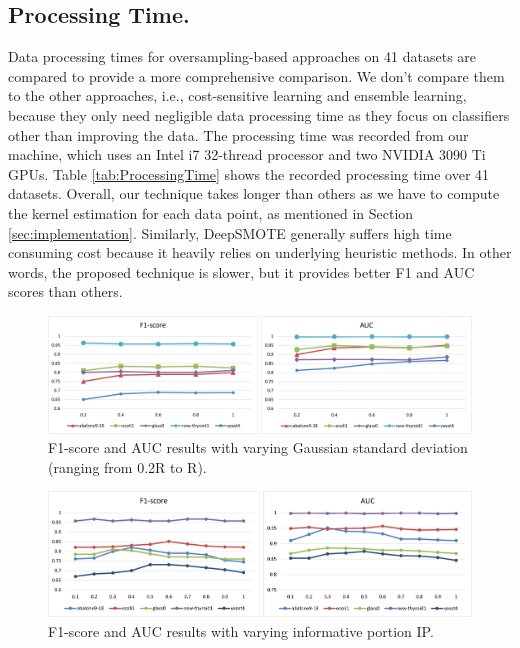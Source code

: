 {\subsection{Processing Time.}
\label{sec:processingTime}
Data processing times for oversampling-based approaches on 41 datasets are compared to provide a more comprehensive comparison. We don't compare them to the other approaches, i.e., cost-sensitive learning and ensemble learning, because they only need negligible data processing time as they focus on classifiers other than improving the data. The processing time was recorded from our machine, which uses an Intel i7 32-thread processor and two NVIDIA 3090 Ti GPUs. 
Table \ref{tab:ProcessingTime} shows the recorded processing time over 41 datasets. Overall, our technique takes longer than others as we have to compute the kernel estimation for each data point, as mentioned in Section \ref{sec:implementation}. Similarly, DeepSMOTE generally suffers high time consuming cost because it heavily relies on underlying heuristic methods. In other words, the proposed technique is slower, but it provides better F1 and AUC scores than others.

}

\begin{figure}[ht]
	\centering
	\includegraphics[width=0.98\linewidth, trim=5 10 10 10, clip ]{Figures/r_impact}
	\caption{F1-score and AUC results with varying Gaussian standard deviation (ranging from 0.2R to R).}
	\label{fig:r_result}
\end{figure}

\begin{figure}[h]
	\centering
	\includegraphics[width=0.98\linewidth, trim=5 10 10 10, clip ]{Figures/threshold_impact}
	\caption{F1-score and AUC results with varying informative portion IP.}
	\label{fig:ip_result}
\end{figure}

